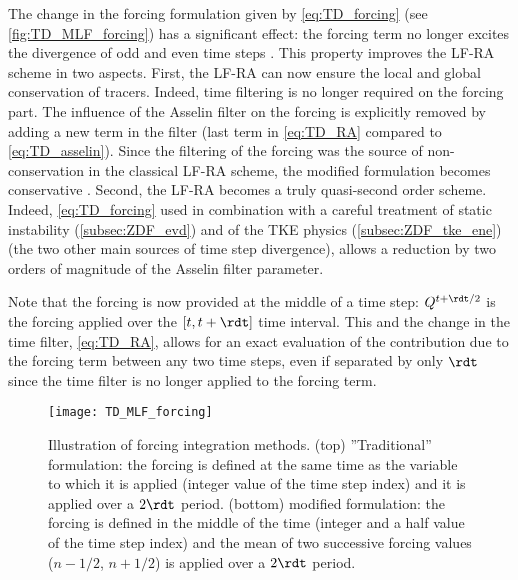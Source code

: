 \documentclass[../main/NEMO_manual]{subfiles}
\begin{document}
The change in the forcing formulation given by \autoref{eq:TD_forcing}
(see \autoref{fig:TD_MLF_forcing}) has a significant effect:
the forcing term no longer excites the divergence of odd and even time steps
\citep{leclair.madec_OM09}.
This property improves the LF-RA scheme in two aspects.
First, the LF-RA can now ensure the local and global conservation of tracers.
Indeed, time filtering is no longer required on the forcing part.
The influence of the Asselin filter on the forcing is explicitly removed by
adding a new term in the filter (last term in \autoref{eq:TD_RA} compared to \autoref{eq:TD_asselin}).
Since the filtering of the forcing was the source of non-conservation in the classical LF-RA scheme,
the modified formulation becomes conservative \citep{leclair.madec_OM09}.
Second, the LF-RA becomes a truly quasi-second order scheme.
Indeed, \autoref{eq:TD_forcing} used in combination with a careful treatment of static instability
(\autoref{subsec:ZDF_evd}) and of the TKE physics (\autoref{subsec:ZDF_tke_ene})
(the two other main sources of time step divergence),
allows a reduction by two orders of magnitude of the Asselin filter parameter.

Note that the forcing is now provided at the middle of a time step:
$Q^{t + \rdt / 2}$ is the forcing applied over the $[t,t + \rdt]$ time interval.
This and the change in the time filter, \autoref{eq:TD_RA},
allows for an exact evaluation of the contribution due to the forcing term between any two time steps,
even if separated by only $\rdt$ since the time filter is no longer applied to the forcing term.

\begin{figure}
  \centering
  \texttt{[image: TD\_MLF\_forcing]}
  \caption[Forcing integration methods for modified leapfrog (top and bottom)]{
    Illustration of forcing integration methods.
    (top) ''Traditional'' formulation:
    the forcing is defined at the same time as the variable to which it is applied
    (integer value of the time step index) and it is applied over a $2 \rdt$ period.
    (bottom)  modified formulation:
    the forcing is defined in the middle of the time
    (integer and a half value of the time step index) and
    the mean of two successive forcing values ($n - 1 / 2$, $n + 1 / 2$) is applied over
    a $2 \rdt$ period.}
  \label{fig:TD_MLF_forcing}
\end{figure}

\end{document}
